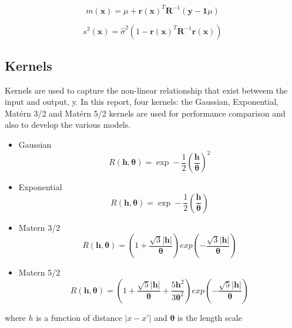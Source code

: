 \documentclass[11pt, letterpaper]{article}
\begin{document}
\begin{equation}
m(\boldsymbol{x}) =  \mu + \boldsymbol{r}(\boldsymbol{x})^T\boldsymbol{R}^{-1}(\boldsymbol{y}-\boldsymbol{1}\mu)
\end{equation}

\begin{equation}
s^2(\boldsymbol{x}) =  \hat{\sigma}^2\left(1-\boldsymbol{r}(\boldsymbol{x})^T\boldsymbol{R}^{-1}\boldsymbol{r}(\boldsymbol{x})\right)
\end{equation}

\subsection{Kernels}
Kernels are used to capture the non-linear relationship that exist betweem the input  and output, y. In this report, four kernels: the Gaussian, Exponential, Mat\'ern 3/2 and Mat\'ern 5/2 kernels are used for performance comparison and also to develop the various models. 

\begin{itemize}
	\item Gaussian	
	\begin{equation}
	R(\boldsymbol{h,\theta}) = \exp-\frac{1}{2}\left(\boldsymbol{\frac{h}{\theta}}\right)^2
	\end{equation}
	
	\item Exponential	
	\begin{equation}
	R(\boldsymbol{h,\theta}) = \exp-\frac{1}{2}\left(\boldsymbol{\frac{h}{\boldsymbol{\theta}}}\right)
	\end{equation}
	
	\item Matern 3/2
	\begin{equation}
	R(\boldsymbol{h,\theta}) = \left(1 + \frac{\sqrt{3}|\boldsymbol{h}|}{\boldsymbol{\theta}}\right)exp\left(-\frac{\sqrt{3}|\boldsymbol{h}|}{\boldsymbol{\theta}}\right)
	\end{equation} 
	
	\item Matern 5/2
	\begin{equation}
	R(\boldsymbol{h,\theta}) = \left(1 + \frac{\sqrt{5}|\boldsymbol{h}|}{\boldsymbol{\theta}} + \frac{5\boldsymbol{h}^2}{3\boldsymbol{\theta}^2}\right)exp\left(-\frac{\sqrt{5}|\boldsymbol{h}|}{\boldsymbol{\boldsymbol{\theta}}}\right)
	\end{equation} 
\end{itemize}
where $h$ is a function of distance $|x-x'|$ and $\boldsymbol{\theta}$ is the length scale
\end{document}
